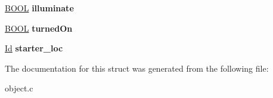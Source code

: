 \begin{DoxyCompactItemize}
\mbox{\label{struct__Object_a6e4edc37e6d8a5237a501c432a4296ca}} 
\hyperlink{types_8h_a3e5b8192e7d9ffaf3542f1210aec18dd}{B\+O\+OL} {\bfseries illuminate}
\item 
\mbox{\label{struct__Object_aa447a4dd98c8c66f485ede35d02ea3a9}} 
\hyperlink{types_8h_a3e5b8192e7d9ffaf3542f1210aec18dd}{B\+O\+OL} {\bfseries turned\+On}
\item 
\mbox{\label{struct__Object_a043532fff17d01f75d4266b65a384e6d}} 
\hyperlink{types_8h_a845e604fb28f7e3d97549da3448149d3}{Id} {\bfseries starter\+\_\+loc}
\end{DoxyCompactItemize}


The documentation for this struct was generated from the following file\+:\begin{DoxyCompactItemize}
\item 
object.\+c\end{DoxyCompactItemize}
